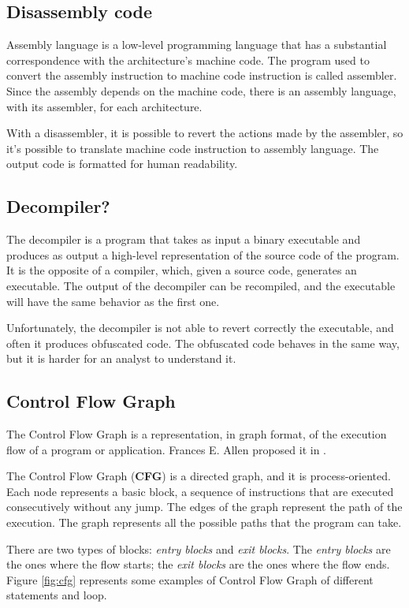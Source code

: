 \subsection{Disassembly code}

Assembly language is a low-level programming language that has a substantial correspondence with the architecture's machine code. The program used to convert the assembly instruction to machine code instruction is called assembler. Since the assembly depends on the machine code, there is an assembly language, with its assembler, for each architecture.

With a disassembler, it is possible to revert the actions made by the assembler, so it's possible to translate machine code instruction to assembly language. The output code is formatted for human readability.

\subsection{Decompiler?}

The decompiler is a program that takes as input a binary executable and produces as output a high-level representation of the source code of the program. It is the opposite of a compiler, which, given a source code, generates an executable. The output of the decompiler can be recompiled, and the executable will have the same behavior as the first one. 

Unfortunately, the decompiler is not able to revert correctly the executable, and often it produces obfuscated code. The obfuscated code behaves in the same way, but it is harder for an analyst to understand it.

\subsection{Control Flow Graph}

The Control Flow Graph is a representation, in graph format, of the execution flow of a program or application. Frances E. Allen proposed it in \cite{allen1970control}.

The Control Flow Graph (\textbf{CFG}) is a directed graph, and it is process-oriented. Each node represents a basic block, a sequence of instructions that are executed consecutively without any jump. The edges of the graph represent the path of the execution. The graph represents all the possible paths that the program can take.

There are two types of blocks:\textit{ entry blocks} and \textit{exit blocks}.
The \textit{entry blocks} are the ones where the flow starts; the \textit{exit blocks} are the ones where the flow ends. Figure \ref{fig:cfg} represents some examples of Control Flow Graph of different statements and loop. 

